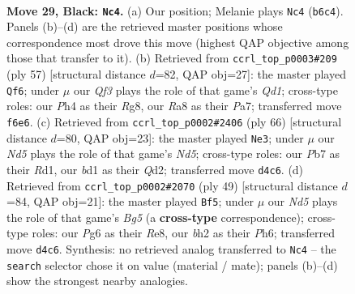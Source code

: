 \documentclass[11pt]{article}
\begin{document}
\clearpage

\begin{figure}[p]\centering
\begin{subfigure}{0.46\textwidth}\centering
\resizebox{\linewidth}{!}{%
\newchessgame
\chessboard[
  setfen={r5k1/1p3pb1/1n3qp1/p2p4/3n3p/4Q2P/PP3PPB/RN1B2K1 b - - 1 29},
  showmover=false,
  pgfstyle=straightmove, color=movearrow, markmove={b6-c4}
]}
\caption{}
\end{subfigure}\hfill
\begin{subfigure}{0.46\textwidth}\centering
\resizebox{\linewidth}{!}{%
\newchessgame
\chessboard[
  setfen={k2q2r1/pb3pp1/1p2p2p/1B1nQ3/3P2PP/P4P2/1P6/1KR1B3 b - - 2 29},
  showmover=false,
  pgfstyle=straightmove, color=movearrow, markmove={d8-f6}
]}
\caption{}
\end{subfigure}
\\[4pt]
\begin{subfigure}{0.46\textwidth}\centering
\resizebox{\linewidth}{!}{%
\newchessgame
\chessboard[
  setfen={1r1q2k1/5pp1/p2pb1np/1p1N4/1P6/P5P1/3Q1PBP/3R2K1 w - - 6 34},
  showmover=false,
  pgfstyle=straightmove, color=movearrow, markmove={d5-e3}
]}
\caption{}
\end{subfigure}\hfill
\begin{subfigure}{0.46\textwidth}\centering
\resizebox{\linewidth}{!}{%
\newchessgame
\chessboard[
  setfen={4r1k1/5pp1/4qn1p/p2p4/3Q2bP/1P1N2P1/P1R2PB1/6K1 b - - 0 25},
  showmover=false,
  pgfstyle=straightmove, color=movearrow, markmove={g4-f5}
]}
\caption{}
\end{subfigure}
\caption{\textbf{Move 29, Black: \texttt{Nc4}.} (a) Our position; Melanie plays \texttt{Nc4} (\texttt{b6c4}). Panels (b)--(d) are the retrieved master positions whose correspondence most drove this move (highest QAP objective among those that transfer to it). (b) Retrieved from \texttt{ccrl\_top\_p0003\#209} (ply 57) [structural distance $d$=82, QAP obj=27]: the master played \texttt{Qf6}; under $\mu$ our \emph{Qf3} plays the role of that game's \emph{Qd1}; cross-type roles: our \emph{P}h4 as their \emph{R}g8, our \emph{R}a8 as their \emph{P}a7; transferred move \texttt{f6e6}. (c) Retrieved from \texttt{ccrl\_top\_p0002\#2406} (ply 66) [structural distance $d$=80, QAP obj=23]: the master played \texttt{Ne3}; under $\mu$ our \emph{Nd5} plays the role of that game's \emph{Nd5}; cross-type roles: our \emph{P}b7 as their \emph{R}d1, our \emph{b}d1 as their \emph{Q}d2; transferred move \texttt{d4c6}. (d) Retrieved from \texttt{ccrl\_top\_p0002\#2070} (ply 49) [structural distance $d$=84, QAP obj=21]: the master played \texttt{Bf5}; under $\mu$ our \emph{Nd5} plays the role of that game's \emph{Bg5} (a \textbf{cross-type} correspondence); cross-type roles: our \emph{P}g6 as their \emph{R}e8, our \emph{b}h2 as their \emph{P}h6; transferred move \texttt{d4c6}. Synthesis: no retrieved analog transferred to \texttt{Nc4} -- the \texttt{search} selector chose it on value (material / mate); panels (b)--(d) show the strongest nearby analogies.}
\label{fig:thought-m57}
\end{figure}
\end{document}
